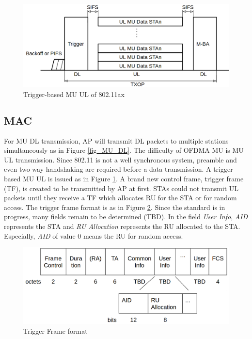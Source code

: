 \documentclass[journal]{IEEEtran}
\begin{document}
\begin{figure}[!t]
\includegraphics[scale=0.21]{./figure/fig_MU_UL.png}
\caption{Trigger-based MU UL of 802.11ax}
\label{fig_MU_UL}
\end{figure}


\subsection{MAC}
For MU DL transmission, AP will transmit DL packets to multiple stations simultaneously as in Figure \ref{fig_MU_DL}. 
The difficulty of OFDMA MU is MU UL transmission. 
Since 802.11 is not a well synchronous system, preamble and even two-way handshaking are required before a data transmission. 
A trigger-based MU UL is issued as in Figure \ref{fig_MU_UL}.
A brand new control frame, trigger frame (TF), is created to be transmitted by AP at first.
STAs could not transmit UL packets until they receive a TF which allocates RU for the STA or for random access. 
The trigger frame format is as in Figure \ref{fig_TF_format}. Since the standard is in progress, many fields remain to be determined (TBD). 
In the field \textit{User Info}, \textit{AID} represents the STA and \textit{RU Allocation} represents the RU allocated to the STA.
Especially, \textit{AID} of value 0 means the RU for random access.

\begin{figure}[!t]
\includegraphics[scale=0.2]{./figure/fig_tf_format.png}
\caption{Trigger Frame format}
\label{fig_TF_format}
\end{figure}
\end{document}

